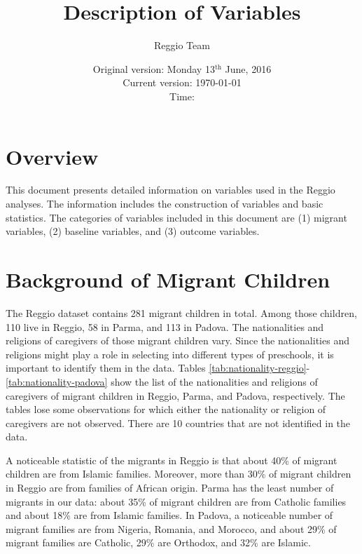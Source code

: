 \documentclass[12pt]{article}
\begin{document}
\title{Description of Variables}
\author{Reggio Team}
\date{Original version: Monday 13$^{\text{th}}$ June, 2016 \\ Current version: \today \\ \vspace{1em} Time: \currenttime}
\maketitle

\tableofcontents

\doublespacing

\section{Overview}

This document presents detailed information on variables used in the Reggio analyses. The information includes the construction of variables and basic statistics. The categories of variables included in this document are (1) migrant variables, (2) baseline variables, and (3) outcome variables. 

\section{Background of Migrant Children}
The Reggio dataset contains 281 migrant children in total. Among those children, 110 live in Reggio, 58 in Parma, and 113 in Padova. The nationalities and religions of caregivers of those migrant children vary. Since the nationalities and religions might play a role in selecting into different types of preschools, it is important to identify them in the data. Tables \ref{tab:nationality-reggio}-\ref{tab:nationality-padova} show the list of the nationalities and religions of caregivers of migrant children in Reggio, Parma, and Padova, respectively. The tables lose some observations for which either the nationality or religion of caregivers are not observed. There are 10 countries that are not identified in the data.

A noticeable statistic of the migrants in Reggio is that about 40\% of migrant children are from Islamic families. Moreover, more than 30\% of migrant children in Reggio are from families of African origin. Parma has the least number of migrants in our data: about 35\% of migrant children are from Catholic families and about 18\% are from Islamic families. In Padova, a noticeable number of migrant families are from Nigeria, Romania, and Morocco, and about 29\% of migrant families are Catholic, 29\% are Orthodox, and 32\% are Islamic. 
\end{document}
